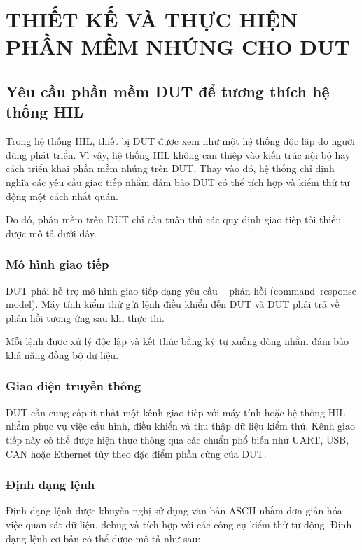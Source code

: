 \chapter{THIẾT KẾ VÀ THỰC HIỆN PHẦN MỀM NHÚNG CHO DUT}
\section{Yêu cầu phần mềm DUT để tương thích hệ thống HIL}

Trong hệ thống HIL, thiết bị DUT được xem như một hệ thống độc lập do người dùng phát triển. Vì vậy, hệ thống HIL không can thiệp vào kiến trúc nội bộ hay cách triển khai phần mềm nhúng trên DUT. Thay vào đó, hệ thống chỉ định nghĩa các yêu cầu giao tiếp nhằm đảm bảo DUT có thể tích hợp và kiểm thử tự động một cách nhất quán.

Do đó, phần mềm trên DUT chỉ cần tuân thủ các quy định giao tiếp tối thiểu được mô tả dưới đây.

\subsection{Mô hình giao tiếp}

DUT phải hỗ trợ mô hình giao tiếp dạng yêu cầu – phản hồi (command–response model). Máy tính kiểm thử gửi lệnh điều khiển đến DUT và DUT phải trả về phản hồi tương ứng sau khi thực thi.

Mỗi lệnh được xử lý độc lập và kết thúc bằng ký tự xuống dòng nhằm đảm bảo khả năng đồng bộ dữ liệu.

\subsection{Giao diện truyền thông}

DUT cần cung cấp ít nhất một kênh giao tiếp với máy tính hoặc hệ thống HIL nhằm phục vụ việc cấu hình, điều khiển và thu thập dữ liệu kiểm thử. 
Kênh giao tiếp này có thể được hiện thực thông qua các chuẩn phổ biến như UART, USB, CAN hoặc Ethernet tùy theo đặc điểm phần cứng của DUT.

\subsection{Định dạng lệnh}

Định dạng lệnh được khuyến nghị sử dụng văn bản ASCII nhằm đơn giản hóa việc quan sát dữ liệu, debug và tích hợp với các công cụ kiểm thử tự động. Định dạng lệnh cơ bản có thể được mô tả như sau:

